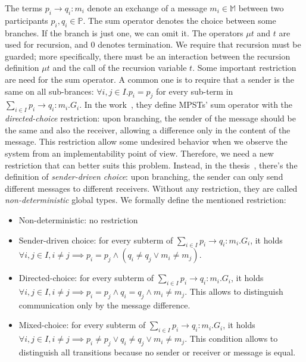 The terms $p_i \to q_i : m_i$ denote an exchange of a message  
$m_i \in \mathbb{M}$ between two participants $p_i, q_i \in \mathbb{P}$.  
The sum operator denotes the choice between some branches.  
If the branch is just one, we can omit it.  
The operators $\mu t$ and $t$ are used for recursion, and $0$ denotes  
termination.  
We require that recursion must be guarded; more specifically,  
there must be an interaction between the recursion definition $\mu t$  
and the call of the recursion variable $t$.
Some important restriction are need for the sum operator.
A common one is to require that a sender is the same on all sub-brances:
$\forall i,j \in I. p_i=p_j$ for every sub-term in $\sum_{i\in I}p_i \to q_i: m_i.G_i$.
In the work~\cite{honda2008multiparty}, they define MPSTs' sum operator with the
\textit{directed-choice} restriction: upon branching, the sender of the message should 
be the same and also the receiver, allowing a difference only in the content of 
the message. This restriction allow some undesired behavior when we observe the
system from an implementability point of view.
Therefore, we need a new restriction that can better suits this problem. 
Instead, in the thesis~\cite{stutz2024implementability}, there's the  
definition of \textit{sender-driven choice}: upon branching, the sender  
can only send different messages to different receivers.
Without any restriction, they are called \textit{non-deterministic}
global types. We formally define the mentioned restriction:
\begin{itemize}
    \item Non-deterministic: no restriction
    \item Sender-driven choice: for every subterm of $\sum_{i\in I}p_i \to q_i: m_i.G_i$,
    it holds $\forall i,j \in I, i\neq j \implies p_i = p_j \land (q_i\neq q_j\lor m_i\neq m_j)$.
    \item Directed-choice: for every subterm of $\sum_{i\in I}p_i \to q_i: m_i.G_i$,
    it holds $\forall i,j \in I, i\neq j \implies p_i = p_j \land q_i = q_j \land m_i\neq m_j$.
    This allows to distinguish communication only by the message difference.
    \item Mixed-choice: for every subterm of $\sum_{i\in I}p_i \to q_i: m_i.G_i$,
    it holds $\forall i,j \in I, i\neq j \implies p_i\neq p_j \lor q_i\neq q_j \lor m_i \neq m_j$.
    This condition allows to distinguish all transitions because no sender or receiver or message is equal.
\end{itemize}

